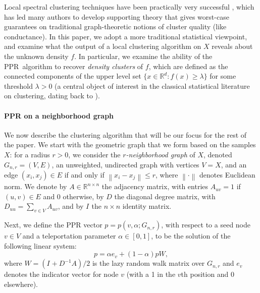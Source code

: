 \documentclass{article}
\newcommand{\Reals}{\mathbb{R}}
\newcommand{\Rd}{\Reals^d}
\newcommand{\norm}[1]{\left\lVert#1\right\rVert}
\newcommand{\1}{\mathbf{1}}
\newcommand{\pbf}{p}        %
\newcommand{\ebf}[1]{{e}_{#1}}
\newcommand{\Abf}{A}
\newcommand{\Xbf}{X}             %
\newcommand{\Wbf}{W}
\newcommand{\Dbf}{D}
\newcommand{\Ibf}[1]{I_{#1}}
\newcommand{\pprspace}{{\sc PPR~}}
\theoremstyle{aldenthm}
\theoremstyle{aldenrmrk}
\begin{document}
Local spectral clustering techniques have been practically very successful
\citep{leskovec2010,andersen2012,gleich2012,mahoney2012,wu2012}, which has led
many authors to develop supporting theory
\citep{spielman2013,andersen2009,gharan2012,zhu2013} that gives worst-case
guarantees on traditional graph-theoretic notions of cluster quality (like
conductance).  In this paper, we adopt a more traditional statistical viewpoint,
and examine what the output of a local clustering algorithm on $\Xbf$ reveals
about the unknown density $f$.  In particular, we examine the ability of the \pprspace algorithm to recover \emph{density clusters} of $f$, which are defined as the
connected components of the upper level set $\{x \in \Rd : f(x) \geq \lambda\}$
for some threshold $\lambda > 0$ (a central object of interest in the
classical statistical literature on clustering, dating back to
\citet{hartigan1981}).

\paragraph{PPR on a neighborhood graph} We now describe the clustering algorithm that will be our focus for the rest of 
the paper. We start with the geometric graph that we form based on the samples 
$\Xbf$: for a radius $r > 0$, we consider the \emph{$r$-neighborhood graph} of 
$\Xbf$, denoted $G_{n,r}=(V,E)$, an unweighted, undirected graph with vertices
$V=\Xbf$, and an edge $(x_i,x_j) \in E$ if and only if $\norm{x_i - x_j}
\leq  r$, where $\norm{\cdot}$ denotes Euclidean norm. We denote by $\Abf \in \Reals^{n \times n}$ the adjacency matrix, with entries $\Abf_{uv} = 1$ if $(u,v) \in E$ and $0$ otherwise, by $\Dbf$ the diagonal degree matrix, with $\Dbf_{uu} = \sum_{v \in V} \Abf_{uv}$, and by $\Ibf{}$ the $n \times n$ identity matrix.

Next, we define the PPR vector $\pbf = \pbf(v,\alpha;G_{n,r})$, with respect to  
a seed node $v \in V$ and a teleportation parameter $\alpha \in [0,1]$, to be
the solution of the following linear system:
\begin{equation}
\label{eqn: ppr_vector}
\pbf = \alpha \ebf{v} + (1 - \alpha) \pbf \Wbf,
\end{equation}
where $\Wbf = (\Ibf{} + \Dbf^{-1}\Abf)/2$ is the lazy random walk matrix over $G_{n,r}$ 
and $e_{v}$ denotes the indicator vector for node $v$ (with a 1 in the $v$th
position and 0 elsewhere).
\end{document}
